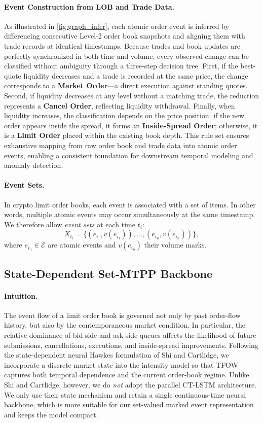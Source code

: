 \paragraph{Event Construction from LOB and Trade Data.}  
As illustrated in \autoref{fig:graph_infer}, each atomic order event is inferred by differencing consecutive Level-2 order book snapshots and aligning them with trade records at identical timestamps. Because trades and book updates are perfectly synchronized in both time and volume, every observed change can be classified without ambiguity through a three-step decision tree.
First, if the best-quote liquidity decreases and a trade is recorded at the same price, the change corresponds to a \textbf{Market Order}—a direct execution against standing quotes.
Second, if liquidity decreases at any level without a matching trade, the reduction represents a \textbf{Cancel Order}, reflecting liquidity withdrawal.
Finally, when liquidity increases, the classification depends on the price position: if the new order appears inside the spread, it forms an \textbf{Inside-Spread Order}; otherwise, it is a \textbf{Limit Order} placed within the existing book depth. This rule set ensures exhaustive mapping from raw order book and trade data into atomic order events, enabling a consistent foundation for downstream temporal modeling and anomaly detection.





\paragraph{Event Sets.} 
In crypto limit order books, each event is associated with a set of items. In other words, multiple atomic events may occur simultaneously at the same timestamp. We therefore allow \emph{event sets} at each time $t_i$:
\[
X_{t_i} = \{(e_{i_1}, v(e_{i_1})), \dots, (e_{i_n}, v(e_{i_n}))\},
\]
where $e_{i_n} \in \mathcal{E}$ are atomic events and $v(e_{i_n})$ their volume marks.

\subsection{State-Dependent Set-MTPP Backbone}

\paragraph{Intuition.}
The event flow of a limit order book is governed not only by past order-flow history, but also by the contemporaneous market condition. In particular, the relative dominance of bid-side and ask-side queues affects the likelihood of future submissions, cancellations, executions, and inside-spread improvements. Following the state-dependent neural Hawkes formulation of Shi and Cartlidge, we incorporate a discrete market state into the intensity model so that TFOW captures both temporal dependence and the current order-book regime. Unlike Shi and Cartlidge, however, we do \emph{not} adopt the parallel CT-LSTM architecture. We only use their state mechanism and retain a single continuous-time neural backbone, which is more suitable for our set-valued marked event representation and keeps the model compact.

